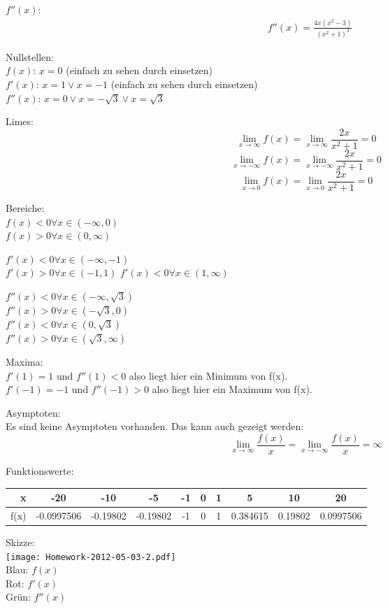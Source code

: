 \documentclass[a4paper]{scrartcl}
\begin{document}
\begin{enumerate}
\(f''(x)\):
\begin{align}
&f''(x)=\frac {4x(x^2-3)} {(x^2+1)^3}
\end{align}

Nullstellen:\\
\(f(x)\): \(x = 0\) (einfach zu sehen durch einsetzen)\\
\(f'(x)\): \(x = 1 \vee x = -1\) (einfach zu sehen durch einsetzen)\\
\(f''(x)\): \(x = 0 \vee x = -\sqrt 3 \vee x = \sqrt 3\)

Limes:\\
\[\lim_{x \to \infty} f(x) = \lim_{x \to \infty} \frac {2x} {x^2+1} = 0\]
\[\lim_{x \to -\infty} f(x) = \lim_{x \to -\infty} \frac {2x} {x^2+1} = 0\]
\[\lim_{x \to 0} f(x) = \lim_{x \to 0} \frac {2x} {x^2+1} = 0\]

Bereiche:\\
\(f(x) < 0 \forall x \in (-\infty,0)\)\\
\(f(x) > 0 \forall x \in (0,\infty)\)

\(f'(x) < 0 \forall x \in (-\infty,-1)\)\\
\(f'(x) > 0 \forall x \in (-1,1)\)
\(f'(x) < 0 \forall x \in (1,\infty)\)


\(f''(x) < 0 \forall x \in (-\infty,\sqrt 3)\)\\
\(f''(x) > 0 \forall x \in (-\sqrt 3,0)\)\\
\(f''(x) < 0 \forall x \in (0, \sqrt 3)\)\\
\(f''(x) > 0 \forall x \in (\sqrt 3, \infty)\)

Maxima:\\
\(f'(1) = 1\) und \(f''(1) < 0\) also liegt hier ein Minimum von f(x).\\
\(f'(-1) = -1\) und \(f''(-1) > 0\) also liegt hier ein Maximum von f(x).

Asymptoten:\\
Es sind keine Asymptoten vorhanden. Das kann auch gezeigt werden:
\[\lim_{x \to \infty} \frac {f(x)} x = \lim_{x \to -\infty} \frac {f(x)} x = \infty\]

Funktionswerte:\\
\begin{tabular}{r|c|c|c|c|c|c|c|c|c}
x & -20 & -10 & -5 & -1 & 0 & 1 & 5 & 10 & 20\\
\hline
f(x) & -0.0997506 & -0.19802 & -0.19802 & -1 & 0 & 1 & 0.384615 & 0.19802 & 0.0997506
\end{tabular}

Skizze:\\
\hspace*{-1.5in}
\texttt{[image: Homework-2012-05-03-2.pdf]}\\
Blau: \(f(x)\)\\
Rot: \(f'(x)\)\\
Grün: \(f''(x)\)



\end{enumerate}
\end{document}
